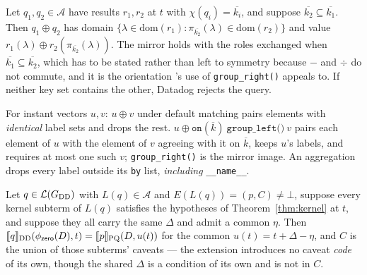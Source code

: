\begin{lemma}\label{lem:dd-matching}
Let $q_1,q_2\in\mathcal{A}$ have results $r_1,r_2$ at $t$ with
$\chi(q_i)=\overline{k_i}$, and suppose $\overline{k_2}\subseteq\overline{k_1}$. Then
$q_1\oplus q_2$ has domain
$\{\lambda\in\mathrm{dom}(r_1) : \pi_{\overline{k_2}}(\lambda)\in\mathrm{dom}(r_2)\}$
and value $r_1(\lambda)\oplus r_2(\pi_{\overline{k_2}}(\lambda))$. The mirror holds with
the roles exchanged when $\overline{k_1}\subseteq\overline{k_2}$, which has to be stated
rather than left to symmetry because $-$ and $\div$ do not commute, and it is the
orientation 's use of \texttt{group\_right()} appeals to. If neither
key set contains the other, Datadog rejects the query.
\end{lemma}

\iffull\fi

\begin{lemma}\label{lem:pq-matching}
For instant vectors $u,v$: $u\oplus v$ under default matching pairs elements with
\emph{identical} label sets and drops the rest. $u \oplus \texttt{on}(\overline{k})\ 
\texttt{group\_left()}\ v$ pairs each element of $u$ with the element of $v$ agreeing
with it on $\overline{k}$, keeps $u$'s labels, and requires at most one such $v$;
\texttt{group\_right()} is the mirror image. An aggregation drops every label outside its
\texttt{by} list, \emph{including} \texttt{\_\_name\_\_}.
\end{lemma}

\iffull\fi

\begin{theorem}\label{thm:arith}
Let $q\in\mathcal{L}(G_{\mathrm{DD}})$ with $L(q)\in\mathcal{A}$ and
$E(L(q))=(p,C)\neq\bot$, suppose every kernel subterm of $L(q)$
satisfies the hypotheses of Theorem~\ref{thm:kernel} at $t$, and suppose they all
carry the same $\Delta$ and admit a common $\eta$. Then
$\llbracket q \rrbracket_{\mathrm{DD}}(\phi_{\mathsf{zero}}(D),t)=\llbracket p \rrbracket_{\mathrm{PQ}}(D,u(t))$ for the
common $u(t)=t+\Delta-\eta$, and $C$ is
the union of those subterms' caveats --- the extension introduces no caveat \emph{code}
of its own, though the shared $\Delta$ is a condition of its own and is not in $C$.
\end{theorem}

